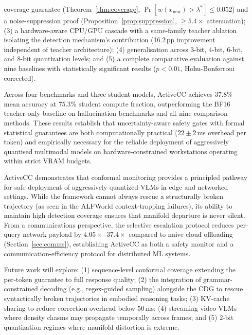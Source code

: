 \documentclass{ieeetmlcn}
\begin{document}
coverage guarantee (Theorem~\ref{thm:coverage},
$\Pr[w(x_{\text{new}})>\lambda^*]\leq 0.052$) and a noise-suppression proof
(Proposition~\ref{prop:suppression}, $\geq 5.4\times$ attenuation); (3)
a hardware-aware CPU/GPU cascade with a same-family teacher ablation
isolating the detection mechanism's contribution (16.2\,pp improvement
independent of teacher architecture); (4) generalisation across 3-bit,
4-bit, 6-bit, and 8-bit quantization levels; and (5) a complete
comparative evaluation against nine baselines with statistically
significant results ($p<0.01$, Holm-Bonferroni corrected).

Across four benchmarks and three student models, ActiveCC achieves
37.8\% mean accuracy at 75.3\% student compute fraction, outperforming
the BF16 teacher-only baseline on hallucination benchmarks and all nine
comparison methods. These results establish that uncertainty-aware
safety gates with formal statistical guarantees are both computationally
practical ($22\pm2$\,ms overhead per token) and empirically necessary
for the reliable deployment of aggressively quantised multimodal models on
hardware-constrained workstations operating within strict VRAM budgets.

ActiveCC demonstrates that conformal monitoring provides a principled pathway for safe deployment of aggressively quantized VLMs in edge and networked settings. While the framework cannot always rescue a structurally broken trajectory (as seen in the ALFWorld context-trapping failures), its ability to maintain high detection coverage ensures that manifold departure is never silent. From a communications perspective, the selective escalation protocol reduces per-query network payload by $4.05\times$--$37.4\times$ compared to naive cloud offloading (Section~\ref{sec:comms}), establishing ActiveCC as both a safety monitor and a communication-efficiency protocol for distributed ML systems.


Future work will explore: (1) sequence-level conformal coverage
extending the per-token guarantee to full response quality; (2) the integration of grammar-constrained decoding (e.g., regex-guided sampling) alongside the CDG to rescue syntactically broken trajectories in embodied reasoning tasks; (3) KV-cache
sharing to reduce correction overhead below 50\,ms; (4) streaming video
VLMs where density chasms may propagate temporally across frames; and
(5) 2-bit quantization regimes where manifold distortion is extreme.


\end{document}
